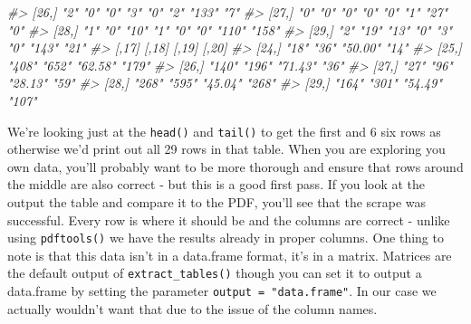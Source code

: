 \documentclass[
  12pt,
  openany]{book}
\newenvironment{Shaded}{\begin{snugshade}}{\end{snugshade}}
\newcommand{\CommentTok}[1]{\textcolor[rgb]{0.37,0.37,0.37}{\textit{#1}}}
\begin{document}
\begin{Shaded}
\begin{Highlighting}[]
\CommentTok{\#\textgreater{} [26,] "2"  "0"   "0"   "3"   "0"   "2"   "133" "7"  }
\CommentTok{\#\textgreater{} [27,] "0"  "0"   "0"   "0"   "0"   "1"   "27"  "0"  }
\CommentTok{\#\textgreater{} [28,] "1"  "0"   "10"  "1"   "0"   "0"   "110" "158"}
\CommentTok{\#\textgreater{} [29,] "2"  "19"  "13"  "0"   "3"   "0"   "143" "21" }
\CommentTok{\#\textgreater{}       [,17] [,18] [,19]   [,20]}
\CommentTok{\#\textgreater{} [24,] "18"  "36"  "50.00" "14" }
\CommentTok{\#\textgreater{} [25,] "408" "652" "62.58" "179"}
\CommentTok{\#\textgreater{} [26,] "140" "196" "71.43" "36" }
\CommentTok{\#\textgreater{} [27,] "27"  "96"  "28.13" "59" }
\CommentTok{\#\textgreater{} [28,] "268" "595" "45.04" "268"}
\CommentTok{\#\textgreater{} [29,] "164" "301" "54.49" "107"}
\end{Highlighting}
\end{Shaded}

We're looking just at the \texttt{head()} and \texttt{tail()} to get the first and 6 six rows as otherwise we'd print out all 29 rows in that table. When you are exploring you own data, you'll probably want to be more thorough and ensure that rows around the middle are also correct - but this is a good first pass. If you look at the output the table and compare it to the PDF, you'll see that the scrape was successful. Every row is where it should be and the columns are correct - unlike using \texttt{pdftools()} we have the results already in proper columns. One thing to note is that this data isn't in a data.frame format, it's in a matrix. Matrices are the default output of \texttt{extract\_tables()} though you can set it to output a data.frame by setting the parameter \texttt{output\ =\ "data.frame"}. In our case we actually wouldn't want that due to the issue of the column names.
\end{document}

